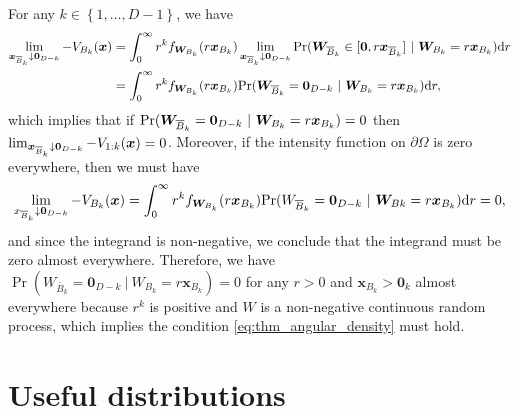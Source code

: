 \documentclass[12pt]{article}
\begin{document}
For any $k \in \left\{1, \ldots, D-1 \right\}$, we have
%
\begin{align*}
\lim_{{\boldsymbol{x}}_{{\overline{B}}_k} \downarrow \bm 0_{D-k} } -V_{B_k}({\boldsymbol{x}}) 
&= \int_0^\infty r^k f_{\bm W_{B_k}}(r {\boldsymbol{x}}_{B_k}) \lim_{{\boldsymbol{x}}_{{\overline{B}}_k} \downarrow \bm 0_{D-k} }{\rm Pr}(\bm W_{{\overline{B}}_k} \in [\bm 0,r {\boldsymbol{x}}_{{\overline{B}}_k} ]\ |\ \bm W_{B_k} = r {\boldsymbol{x}}_{B_k} )\text dr\\
&= \int_0^\infty r^k f_{\bm W_{B_k}}(r {\boldsymbol{x}}_{B_k}){\rm Pr}(\bm W_{{\overline{B}}_k}=\bm 0_{D-k}\ |\ \bm W_{B_k}=r {\boldsymbol{x}}_{B_k} )\text dr,
\end{align*}
%
which implies that if ${\rm Pr}(\bm W_{{\overline{B}}_k}=\bm 0_{D-k}\ |\ \bm W_{B_k}=r {\boldsymbol{x}}_{B_k}) = 0$ then $\lim_{\bm x_{{\overline{B}}_k} \downarrow \bm 0_{D-k} } -V_{1:k}({\boldsymbol{x}}) = 0$. Moreover, if the intensity function on $\partial\Omega$ is zero everywhere, then we must have 
$$
\lim_{x_{{\overline{B}}_k}\downarrow \bm 0_{D-k} } -V_{B_k}(\bm x) 
= \int_0^\infty r^k f_{\bm W_{B_k}}(r \bm x_{B_k}){\rm Pr}(W_{{\overline{B}}_k} = \bm 0_{D-k}\ |\ \bm W_{Bk}=r \bm x_{B_k} )\text dr = 0,
$$
and since the integrand is non-negative, we conclude that the integrand must be zero almost everywhere. Therefore, we have $\Pr(W_{\bar{B}_k} = \bm 0_{D-k}\ |\ W_{B_k}=r\bm x_{B_k} )=0$ for any $r>0$ and $\bm x_{B_k} > \bm 0_k$ almost everywhere because $r^k$ is positive and $W$ is a non-negative continuous random process, which implies the condition \eqref{eq:thm_angular_density} must hold.

\section{Useful distributions}
\end{document}
